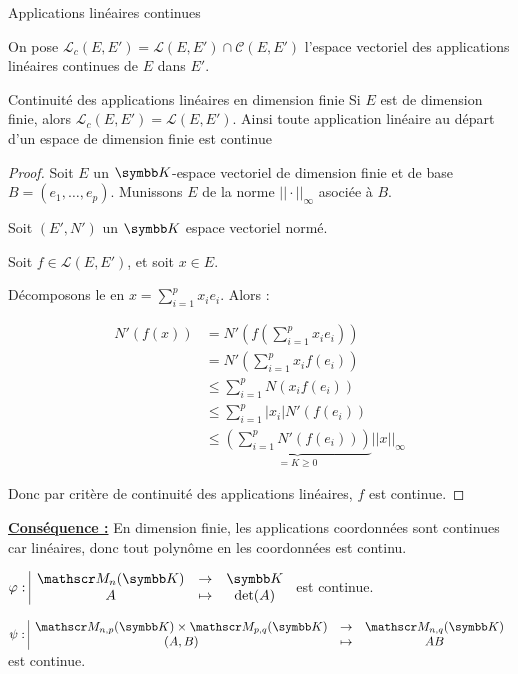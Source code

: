 \begin{definition}{Applications linéaires continues}{}

    On pose $\mathscr L_c(E, E') = \mathscr L (E, E') \cap \mathscr C(E, E')$ l'espace vectoriel 
    des applications linéaires continues de $E$ dans $E'$.
\end{definition}

\begin{theoreme}{Continuité des applications linéaires en dimension finie}{}
    Si $E$ est de dimension finie, alors $\mathscr L_c(E, E') = \mathscr L(E, E')$.
    Ainsi toute application linéaire au départ d'un espace de dimension finie est continue
\end{theoreme}

\begin{proof}
    Soit $E$ un $\K$-espace vectoriel de dimension finie et de base 
    $B = (e_1, \ldots, e_p)$. Munissons $E$ de la norme $||\cdot||_\infty$ asociée à $B$.

    Soit $(E', N')$ un $\K$ espace vectoriel normé. 

    Soit $f \in \mathscr L(E, E')$, et soit $x \in E$. 

    Décomposons le en $\displaystyle x = \sum_{i=1}^p x_i e_i$. Alors : 

    \begin{align*}
        N'(f(x)) & = N'\left( f\left( \sum_{i=1}^p x_i e_i \right) \right) \\
        & = N'\left( \sum_{i=1}^p x_i f(e_i) \right) \\
        & \leqslant \sum_{i=1}^p N(x_i f(e_i)) \\
        & \leqslant \sum_{i=1}^p |x_i| N'(f(e_i)) \\
        & \leqslant \underbrace{\left( \sum_{i=1}^p N'(f(e_i)) \right)}_{ = K \geqslant 0} ||x||_\infty
    \end{align*}

    Donc par critère de continuité des applications linéaires, $f$ est continue.
\end{proof}

\textbf{\uline{Conséquence :}} 
En dimension finie, les applications coordonnées sont continues car linéaires, donc 
tout polynôme en les coordonnées est continu. 

\avspace $\fonction{\varphi}{\mathscr M_n(\K)} \K A {\det(A)}$ est continue.

$\fonction {\psi}{\mathscr M_{n, p}(\K) \times \mathscr M_{p, q}(\K)}{\mathscr M_{n, q}(\K)}{(A, B)}{AB}$ est continue.

